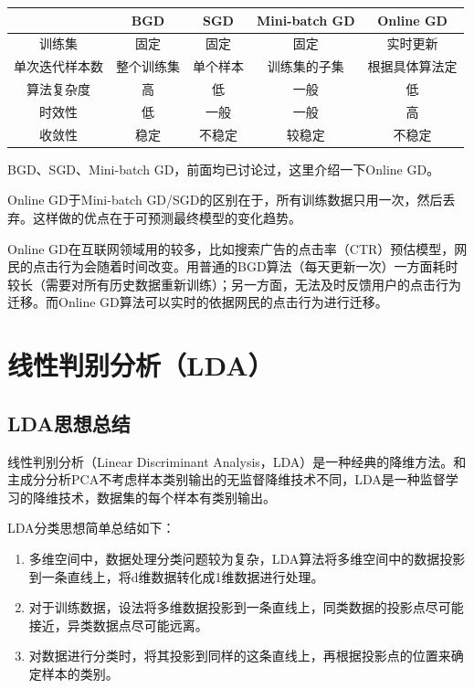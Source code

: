 \begin{table}[h]
	\centering
	\begin{tabular}{|c|c|c|c|c|} \hline
	& BGD & SGD & Mini-batch GD & Online GD \\\hline
	训练集 & 固定 & 固定 & 固定 & 实时更新 \\\hline
	单次迭代样本数 & 整个训练集 & 单个样本 & 训练集的子集 & 根据具体算法定 \\\hline
	算法复杂度 & 高 & 低 & 一般 & 低  \\\hline
	时效性 & 低 & 一般 & 一般 & 高 \\\hline
	收敛性 & 稳定 & 不稳定 & 较稳定 & 不稳定 \\\hline
	\end{tabular}
\end{table}

BGD、SGD、Mini-batch GD，前面均已讨论过，这里介绍一下Online GD。

Online GD于Mini-batch GD/SGD的区别在于，所有训练数据只用一次，然后丢弃。这样做的优点在于可预测最终模型的变化趋势。

Online GD在互联网领域用的较多，比如搜索广告的点击率（CTR）预估模型，网民的点击行为会随着时间改变。用普通的BGD算法（每天更新一次）一方面耗时较长（需要对所有历史数据重新训练）；另一方面，无法及时反馈用户的点击行为迁移。而Online GD算法可以实时的依据网民的点击行为进行迁移。

\section{线性判别分析（LDA）}

\subsection{LDA思想总结}

线性判别分析（Linear Discriminant Analysis，LDA）是一种经典的降维方法。和主成分分析PCA不考虑样本类别输出的无监督降维技术不同，LDA是一种监督学习的降维技术，数据集的每个样本有类别输出。  


LDA分类思想简单总结如下：  

\begin{enumerate}
\itemsep0em 
\item 多维空间中，数据处理分类问题较为复杂，LDA算法将多维空间中的数据投影到一条直线上，将d维数据转化成1维数据进行处理。  
\item 对于训练数据，设法将多维数据投影到一条直线上，同类数据的投影点尽可能接近，异类数据点尽可能远离。  
\item 对数据进行分类时，将其投影到同样的这条直线上，再根据投影点的位置来确定样本的类别。  
\end{enumerate}

